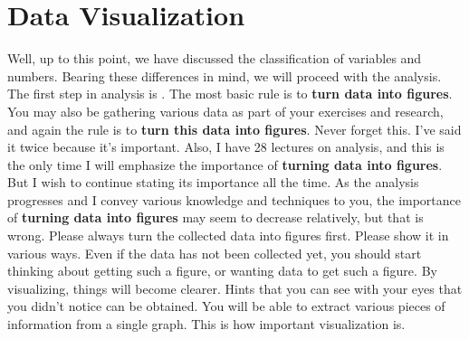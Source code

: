 \documentclass{ltjsbook}
\begin{document}
\section{Data Visualization}
\label{dataVisualization}
Well, up to this point, we have discussed the classification of variables and numbers. Bearing these differences in mind, we will proceed with the analysis. The first step in analysis is . The most basic rule is to \textbf{turn data into figures}. You may also be gathering various data as part of your exercises and research, and again the rule is to \textbf{turn this data into figures}. Never forget this. I've said it twice because it's important. Also, I have 28 lectures on analysis, and this is the only time I will emphasize the importance of \textbf{turning data into figures}. But I wish to continue stating its importance all the time. As the analysis progresses and I convey various knowledge and techniques to you, the importance of \textbf{turning data into figures} may seem to decrease relatively, but that is wrong. Please always turn the collected data into figures first. Please show it in various ways. Even if the data has not been collected yet, you should start thinking about getting such a figure, or wanting data to get such a figure. By visualizing, things will become clearer. Hints that you can see with your eyes that you didn't notice can be obtained. You will be able to extract various pieces of information from a single graph. This is how important visualization is.
\end{document}
